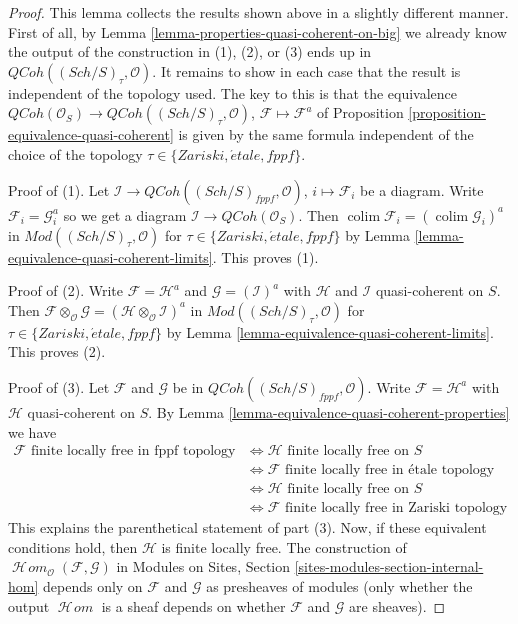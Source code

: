 \documentclass{stacks-project}
\theoremstyle{plain}
\theoremstyle{definition}
\theoremstyle{remark}
\numberwithin{equation}{subsection}
\def\colim{\mathop{\mathrm{colim}}\nolimits}
\def\SheafHom{\mathop{\mathcal{H}\!\mathit{om}}\nolimits}
\def\Sch{\mathit{Sch}}
\def\etale{{\acute{e}tale}}
\def\QCoh{\mathit{QCoh}}
\begin{document}
\begin{proof}
This lemma collects the results shown above in a slightly different manner.
First of all, by Lemma \ref{lemma-properties-quasi-coherent-on-big}
we already know the output of the construction in (1), (2), or (3)
ends up in $\QCoh((\Sch/S)_\tau, \mathcal{O})$.
It remains to show in each case that the result is
independent of the topology used. The key to this is that the equivalence
$\QCoh(\mathcal{O}_S) \to \QCoh((\Sch/S)_\tau, \mathcal{O})$,
$\mathcal{F} \mapsto \mathcal{F}^a$
of Proposition \ref{proposition-equivalence-quasi-coherent}
is given by the same formula independent of the choice
of the topology $\tau \in \{Zariski, \etale, fppf\}$.

\medskip\noindent
Proof of (1). Let $\mathcal{I} \to \QCoh((\Sch/S)_{fppf}, \mathcal{O})$,
$i \mapsto \mathcal{F}_i$ be a diagram. Write
$\mathcal{F}_i = \mathcal{G}_i^a$ so we get a diagram
$\mathcal{I} \to \QCoh(\mathcal{O}_S)$.
Then $\colim \mathcal{F}_i = (\colim \mathcal{G}_i)^a$ in
$\textit{Mod}((\Sch/S)_\tau, \mathcal{O})$ for
$\tau \in \{Zariski, \etale, fppf\}$
by Lemma \ref{lemma-equivalence-quasi-coherent-limits}.
This proves (1).

\medskip\noindent
Proof of (2). Write $\mathcal{F} = \mathcal{H}^a$ and
$\mathcal{G} = (\mathcal{I})^a$ with $\mathcal{H}$ and $\mathcal{I}$
quasi-coherent on $S$. Then
$\mathcal{F} \otimes_\mathcal{O} \mathcal{G} =
(\mathcal{H} \otimes_\mathcal{O} \mathcal{I})^a$ in
$\textit{Mod}((\Sch/S)_\tau, \mathcal{O})$ for
$\tau \in \{Zariski, \etale, fppf\}$
by Lemma \ref{lemma-equivalence-quasi-coherent-limits}.
This proves (2).

\medskip\noindent
Proof of (3). Let $\mathcal{F}$ and $\mathcal{G}$ be in
$\QCoh((\Sch/S)_{fppf}, \mathcal{O})$. Write
$\mathcal{F} = \mathcal{H}^a$ with $\mathcal{H}$
quasi-coherent on $S$. By
Lemma \ref{lemma-equivalence-quasi-coherent-properties} we have
\begin{align*}
\mathcal{F}\text{ finite locally free in fppf topology}
& \Leftrightarrow
\mathcal{H}\text{ finite locally free on }S \\
& \Leftrightarrow
\mathcal{F}\text{ finite locally free in \'etale topology} \\
& \Leftrightarrow
\mathcal{H}\text{ finite locally free on }S \\
& \Leftrightarrow
\mathcal{F}\text{ finite locally free in Zariski topology}
\end{align*}
This explains the parenthetical statement of part (3).
Now, if these equivalent conditions hold, then $\mathcal{H}$
is finite locally free. The construction of
$\SheafHom_\mathcal{O}(\mathcal{F}, \mathcal{G})$ in
Modules on Sites, Section \ref{sites-modules-section-internal-hom}
depends only on $\mathcal{F}$ and $\mathcal{G}$ as presheaves
of modules (only whether the output $\SheafHom$ is
a sheaf depends on whether $\mathcal{F}$ and $\mathcal{G}$ are
sheaves).
\end{proof}
\end{document}
